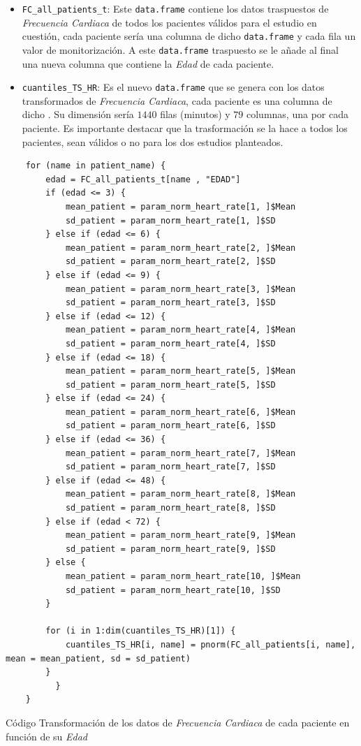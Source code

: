 \begin{itemize}
    \item \texttt{FC\_all\_patients\_t}: Este \texttt{data.frame} contiene los datos traspuestos de \textit{Frecuencia Cardiaca} de todos los pacientes válidos para el estudio en cuestión, cada paciente sería una columna de dicho \texttt{data.frame} y cada fila un valor de monitorización. A este \texttt{data.frame} traspuesto se le añade al final una nueva columna que contiene la \textit{Edad} de cada paciente.
    \item \texttt{cuantiles\_TS\_HR}: Es el nuevo \texttt{data.frame} que se genera con los datos transformados de \textit{Frecuencia Cardiaca}, cada paciente es una columna de dicho . Su dimensión sería $1440$ filas (minutos) y $79$ columnas, una por cada paciente. Es importante destacar que la trasformación se la hace a todos los pacientes, sean válidos o no para los dos estudios planteados. 
\end{itemize}

\begin{code}[H]
    \begin{lstlisting}
    for (name in patient_name) {
        edad = FC_all_patients_t[name , "EDAD"]
        if (edad <= 3) {
            mean_patient = param_norm_heart_rate[1, ]$Mean
            sd_patient = param_norm_heart_rate[1, ]$SD
        } else if (edad <= 6) {
            mean_patient = param_norm_heart_rate[2, ]$Mean
            sd_patient = param_norm_heart_rate[2, ]$SD
        } else if (edad <= 9) {
            mean_patient = param_norm_heart_rate[3, ]$Mean
            sd_patient = param_norm_heart_rate[3, ]$SD
        } else if (edad <= 12) {
            mean_patient = param_norm_heart_rate[4, ]$Mean
            sd_patient = param_norm_heart_rate[4, ]$SD
        } else if (edad <= 18) {
            mean_patient = param_norm_heart_rate[5, ]$Mean
            sd_patient = param_norm_heart_rate[5, ]$SD
        } else if (edad <= 24) {
            mean_patient = param_norm_heart_rate[6, ]$Mean
            sd_patient = param_norm_heart_rate[6, ]$SD
        } else if (edad <= 36) {
            mean_patient = param_norm_heart_rate[7, ]$Mean
            sd_patient = param_norm_heart_rate[7, ]$SD
        } else if (edad <= 48) {
            mean_patient = param_norm_heart_rate[8, ]$Mean
            sd_patient = param_norm_heart_rate[8, ]$SD
        } else if (edad < 72) {
            mean_patient = param_norm_heart_rate[9, ]$Mean
            sd_patient = param_norm_heart_rate[9, ]$SD
        } else {
            mean_patient = param_norm_heart_rate[10, ]$Mean
            sd_patient = param_norm_heart_rate[10, ]$SD
        }
        
        for (i in 1:dim(cuantiles_TS_HR)[1]) {
            cuantiles_TS_HR[i, name] = pnorm(FC_all_patients[i, name], mean = mean_patient, sd = sd_patient)
        }
          }
    }
    \end{lstlisting}
    \caption{Código Transformación de los datos de \textit{Frecuencia Cardiaca} de cada paciente en función de su \textit{Edad}}
    \label{cod:transformación-frecuencia-cardiaca}
\end{code}


